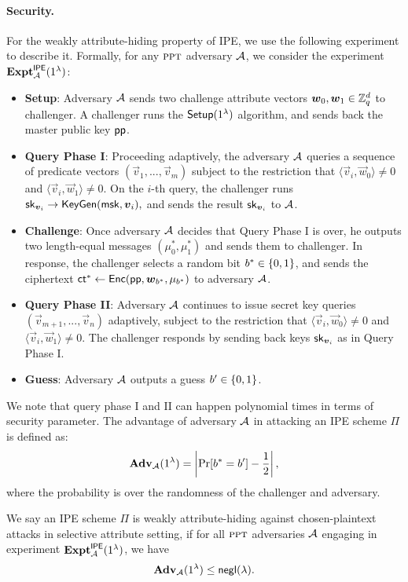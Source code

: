\paragraph{Security.} For the weakly attribute-hiding property of IPE, we use the following experiment to describe it. Formally, for any $\textsc{ppt}$ adversary $\mathcal{A}$, we consider the experiment $\mathbf{Expt}_{\mathcal{A}}^{\mathsf{IPE}}(1^\lambda)$:
\begin{itemize}[leftmargin=*]
 \item \textbf{Setup}: Adversary $\mathcal{A}$ sends two challenge attribute vectors $\boldsymbol{w}_{0}, \boldsymbol{w}_{1} \in \mathbb{Z}_q^d$ to challenger.  A challenger runs the $\mathsf{Setup}(1^\lambda)$ algorithm, and sends back the master public key $\mathsf{pp}$.
 \item \textbf{Query Phase I}: Proceeding adaptively, the adversary $\mathcal{A}$ queries a sequence of predicate vectors $(\vec{v}_1,..., \vec{v}_m)$ subject to the restriction that $\langle \vec{v}_i, \vec{w}_{0} \rangle \neq 0$ and $\langle \vec{v}_i, \vec{w}_{1} \rangle \neq 0$. On the $i$-th query, the challenger runs $\mathsf{sk}_{\boldsymbol{v}_i} \rightarrow \mathsf{KeyGen}(\mathsf{msk}, \boldsymbol{v}_i),$ and sends the result $\mathsf{sk}_{\boldsymbol{v}_i}$ to $\mathcal{A}$.
 \item \textbf{Challenge}: Once adversary $\mathcal{A}$ decides that Query Phase I is over, he outputs two length-equal messages $(\mu^*_0, \mu^*_1)$ and sends them to challenger.  In response, the challenger selects a random bit $b^* \in \{0,1\}$, and sends the ciphertext $\mathsf{ct}^* \leftarrow \mathsf{Enc}(\mathsf{pp}, \boldsymbol{w}_{b^*}, \mu_{b^*})$ to adversary $\mathcal{A}$.
 \item \textbf{Query Phase II}: Adversary $\mathcal{A}$ continues to issue secret key queries $(\vec{v}_{m + 1},..., \vec{v}_{n})$ adaptively, subject to the restriction that $\langle \vec{v}_i, \vec{w}_{0} \rangle \neq 0$ and $\langle \vec{v}_i, \vec{w}_{1} \rangle \neq 0$. The challenger responds by sending back keys $\mathsf{sk}_{\boldsymbol{v}_i}$ as in Query Phase I.
 \item \textbf{Guess}: Adversary $\mathcal{A}$ outputs a guess $b' \in \{0,1\}$.
\end{itemize}
We note that query phase I and II can happen polynomial times in terms of security parameter. The advantage of adversary $\mathcal{A}$ in attacking an IPE scheme $\Pi$ is defined as:
$$\mathbf{Adv}_{\mathcal{A}}(1^\lambda) = \left|\Pr[b^* = b'] - \frac{1}{2}\right|,$$
\noindent where the probability is over the randomness of the challenger and adversary.

\begin{definition}\label{defn:sec}
We say an IPE scheme $\Pi$ is weakly attribute-hiding against chosen-plaintext attacks in selective attribute setting, if for all $\textsc{ppt}$ adversaries $\mathcal{A}$ engaging in experiment $\mathbf{Expt}_{\mathcal{A}}^{\mathsf{IPE}}(1^\lambda)$, we have
$$\mathbf{Adv}_{\mathcal{A}}(1^\lambda) \leq \mathsf{negl}(\lambda).$$
\end{definition}

